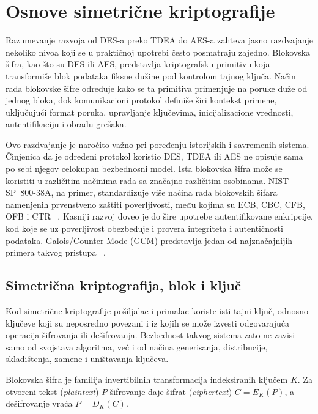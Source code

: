 \section{Osnove simetrične kriptografije}
\label{sec:osnove}

Razumevanje razvoja od DES-a preko TDEA do AES-a zahteva jasno
razdvajanje nekoliko nivoa koji se u praktičnoj upotrebi često
posmatraju zajedno. Blokovska šifra, kao što su DES ili AES, predstavlja
kriptografsku primitivu koja transformiše blok podataka fiksne dužine
pod kontrolom tajnog ključa. Način rada blokovske šifre određuje kako se
ta primitiva primenjuje na poruke duže od jednog bloka, dok komunikacioni
protokol definiše širi kontekst primene, uključujući format poruka,
upravljanje ključevima, inicijalizacione vrednosti, autentifikaciju i
obradu grešaka.

Ovo razdvajanje je naročito važno pri poređenju istorijskih i savremenih
sistema. Činjenica da je određeni protokol koristio DES, TDEA ili
AES ne opisuje sama po sebi njegov celokupan bezbednosni model. Ista
blokovska šifra može se koristiti u različitim načinima rada sa značajno
različitim osobinama. NIST SP~800-38A, na primer, standardizuje više
načina rada blokovskih šifara namenjenih prvenstveno zaštiti
poverljivosti, među kojima su ECB, CBC, CFB, OFB i CTR
~\cite{sp800-38a}. Kasniji razvoj doveo je do šire upotrebe
autentifikovane enkripcije, kod koje se uz poverljivost obezbeđuje i
provera integriteta i autentičnosti podataka. Galois/Counter Mode (GCM)
predstavlja jedan od najznačajnijih primera takvog pristupa
~\cite{sp800-38d}.


\subsection{Simetrična kriptografija, blok i ključ}
\label{subsec:simetricna_kriptografija}

Kod simetrične kriptografije pošiljalac i primalac koriste isti tajni
ključ, odnosno ključeve koji su neposredno povezani i iz kojih se može
izvesti odgovarajuća operacija šifrovanja ili dešifrovanja. Bezbednost
takvog sistema zato ne zavisi samo od svojstava algoritma, već i od
načina generisanja, distribucije, skladištenja, zamene i uništavanja
ključeva.

Blokovska šifra je familija invertibilnih transformacija indeksiranih
ključem $K$. Za otvoreni tekst (\emph{plaintext}) $P$ šifrovanje daje
šifrat (\emph{ciphertext}) $C=E_K(P)$, a dešifrovanje vraća
$P=D_K(C)$.

